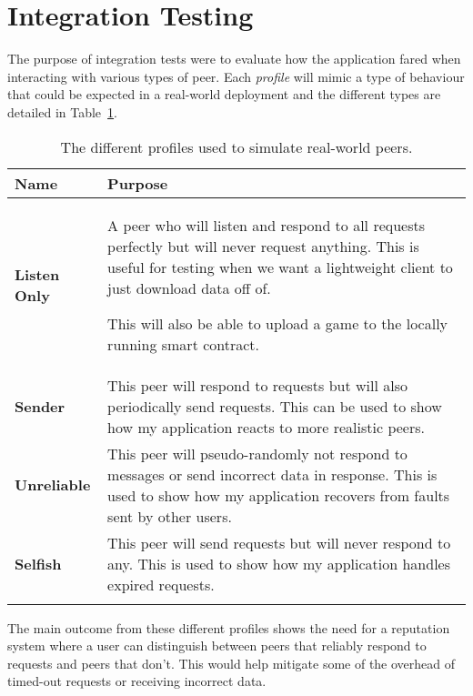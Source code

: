 \section{Integration Testing}

The purpose of integration tests were to evaluate how the application fared when interacting with various types of peer. Each \textit{profile} will mimic a type of behaviour that could be expected in a real-world deployment and the different types are detailed in Table~\ref{tab:profiles}.

\small
\begin{longtable}{p{} p{}}
  \toprule
  \textbf{Name} & \textbf{Purpose}
  \\\midrule\midrule
  \textbf{Listen Only}
  & A peer who will listen and respond to all requests perfectly but will never request anything. This is useful for testing when we want a lightweight client to just download data off of. 
  
  This will also be able to upload a game to the locally running smart contract.
  \\
  \textbf{Sender}
  & This peer will respond to requests but will also periodically send requests. This can be used to show how my application reacts to more realistic peers. 
  \\
  \textbf{Unreliable}
  & This peer will pseudo-randomly not respond to messages or send incorrect data in response. This is used to show how my application recovers from faults sent by other users.
  \\
  \textbf{Selfish}
  & This peer will send requests but will never respond to any. This is used to show how my application handles expired requests.
  \\\bottomrule\bottomrule
  \caption{The different profiles used to simulate real-world peers.}
  \label{tab:profiles}
\end{longtable}
\normalsize

\noindent
The main outcome from these different profiles shows the need for a reputation system where a user can distinguish between peers that reliably respond to requests and peers that don't. This would help mitigate some of the overhead of timed-out requests or receiving incorrect data.
